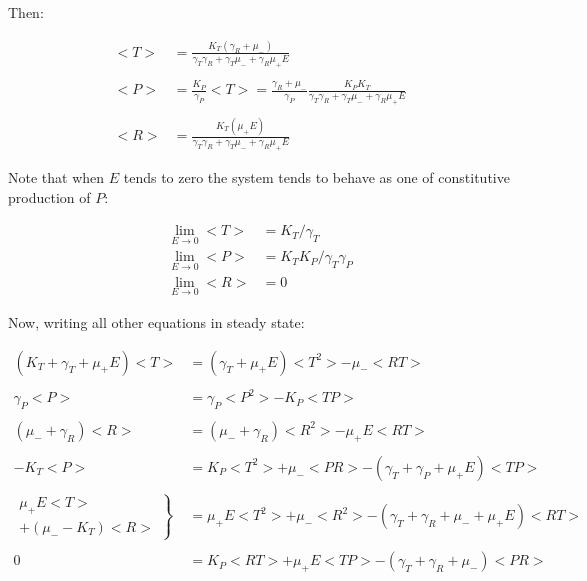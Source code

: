 \documentclass{article}
\begin{document}
Then:

\begin{align*}
    <T> &= \frac{K_T(\gamma_R + \mu_-)}{\gamma_T\gamma_R + \gamma_T\mu_- + \gamma_R\mu_+E}\\
    \\
    <P> &= \frac{K_P}{\gamma_P}<T> = \frac{\gamma_R + \mu_-}{\gamma_P}\frac{K_PK_T}{\gamma_T\gamma_R + \gamma_T\mu_- + \gamma_R\mu_+E}\\
    \\
    <R> &= \frac{K_T(\mu_+E)}{\gamma_T\gamma_R + \gamma_T\mu_- + \gamma_R\mu_+E}
\end{align*}

Note that when $E$ tends to zero the system tends to behave as one of constitutive production of $P$:

\begin{align*}
    \lim_{E \to 0} <T> &= K_T/\gamma_T\\
    \lim_{E \to 0} <P> &= K_TK_P/\gamma_T\gamma_P\\
    \lim_{E \to 0} <R> &= 0
\end{align*}

Now, writing all other equations in steady state:

\begin{align}
    (K_T + \gamma_T + \mu_+E)<T> &= (\gamma_T + \mu_+E)<T^2> - \mu_-<RT>\\
                        \nonumber\\
                     \gamma_P<P> &= \gamma_P<P^2> - K_P<TP>\\
                        \nonumber\\
           (\mu_- + \gamma_R)<R> &= (\mu_- + \gamma_R)<R^2> - \mu_+E<RT>\\
                        \nonumber\\
                         -K_T<P> &= K_P<T^2> + \mu_-<PR> - (\gamma_T + \gamma_P + \mu_+E)<TP>\\
                        \nonumber\\
    \left.\begin{aligned}
            \mu_+E<T>\\
            +(\mu_- - K_T)<R>
            \end{aligned}
    \right\} & = \mu_+E<T^2> + \mu_-<R^2> - (\gamma_T + \gamma_R + \mu_- + \mu_+E)<RT>\\
                        \nonumber\\
                               0 &= K_P<RT> + \mu_+E<TP> - (\gamma_T + \gamma_R + \mu_-)<PR>
\end{align}
\end{document}
